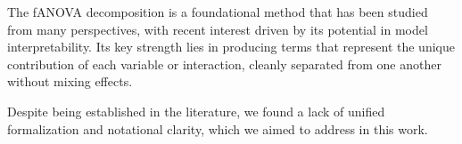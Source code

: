 






The fANOVA decomposition is a foundational method that has been studied from many perspectives, with recent interest driven by its potential in model interpretability. Its key strength lies in producing terms that represent the unique contribution of each variable or interaction, cleanly separated from one another without mixing effects.\par

Despite being established in the literature, we found a lack of unified formalization and notational clarity, which we aimed to address in this work.\par

